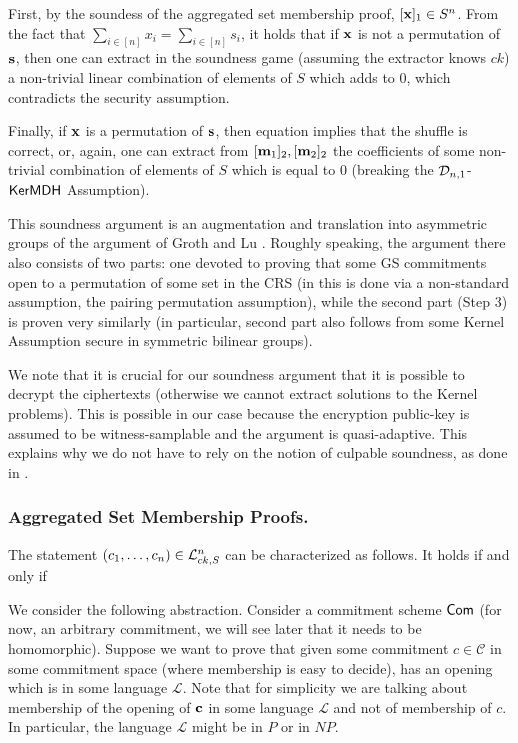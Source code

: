First, by the soundess of the aggregated set membership proof, $[\mathbf{x}]_1 \in S^{n}$. From the fact that 
 $\sum_{i \in [n]} x_i =\sum_{i \in [n]} s_i$, it holds that if 
 $\mathbf{x}$ is not a permutation of $\mathbf{s}$, then one can extract in the soundness game (assuming the extractor knows $ck$) a non-trivial linear combination of elements of $S$ which adds to $0$, which contradicts the security assumption. 
 
Finally, if $\mathbf{x}$ is a permutation of $\mathbf{s}$,  then equation \label{shuffle:ker} implies that the shuffle is correct, or, again, 
one can extract from   $[\mathbf{m}_1]_2,[\mathbf{m}_2]_2$ the coefficients of some non-trivial combination of elements of $S$ which is equal to $0$ (breaking the $\mathcal{D}_{n,1}$-$\mathsf{KerMDH}$ Assumption). 

This soundness argument is an augmentation and translation into asymmetric groups of the argument of Groth and Lu \cite{AC:GroLu07}. Roughly speaking, the argument there also consists of two parts: one devoted to proving that some GS commitments open to a permutation of some set in the CRS (in \cite{AC:GroLu07} this is done via a non-standard assumption, the pairing permutation assumption), while the second part (Step 3) is proven very similarly (in particular, second part also follows from some Kernel Assumption secure in symmetric bilinear groups).  

We note that it is crucial for our soundness argument that it is possible to decrypt the ciphertexts (otherwise we cannot extract solutions to the Kernel problems). This is possible in our case because the encryption public-key is assumed to be witness-samplable and the argument is quasi-adaptive. This explains why we do not have to rely on the notion of culpable soundness, as done in \cite{AC:GroLu07,EPRINT:FauLip15}.

\subsubsection{Aggregated Set Membership Proofs.} The statement $(c_1,\ldots,c_n) \in \mathcal{L}_{ck,S}^n$ can be characterized as follows. It holds if and only if 



  






We consider the following abstraction. Consider a commitment scheme $\mathsf{Com}$ (for now, an arbitrary commitment, we will see later that it needs to be homomorphic). Suppose we want to prove that given some commitment $c \in \mathcal{C}$ in some commitment space (where membership is easy to decide), has an opening which is in some language $\mathcal{L}$. Note that for simplicity we are talking about membership of the opening of $\mathbf{c}$ in some language $\mathcal{L}$ and not of membership of $c$. In particular, the language $\mathcal{L}$ might be in $P$ or in $NP$. 

